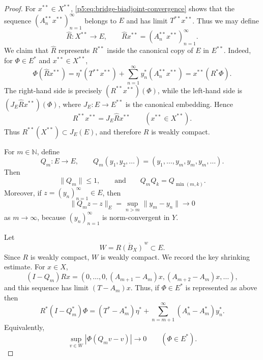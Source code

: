 \documentclass[11pt,reqno]{amsart}
\makeatletter
\theoremstyle{plain}
\theoremstyle{definition}
\newcounter{problempaper}
\newenvironment{problempaperbody}{%
  \setcounter{subsection}{0}%
  \setcounter{subsubsection}{0}%
  \setcounter{paragraph}{0}%
  \renewcommand{\thesubsection}{\arabic{subsection}}%
  \renewcommand{\thesubsubsection}{\thesubsection.\arabic{subsubsection}}%
  \renewcommand{\theparagraph}{\thesubsubsection.\arabic{paragraph}}%
  \let\problem@outersection\section
  \let\problem@outersubsection\subsection
  \let\problem@outersubsubsection\subsubsection
  \let\problem@outerparagraph\paragraph
  \let\section\problem@papersection
  \let\subsection\problem@papersubsection
  \let\subsubsection\problem@papersubsubsection
}{%
  \let\section\problem@outersection
  \let\subsection\problem@outersubsection
  \let\subsubsection\problem@outersubsubsection
  \let\paragraph\problem@outerparagraph
}
\newcommand{\problem@target}[2]{%
  \hypertarget{problem-\theproblempaper-#1-#2}{}%
}
\newcommand{\problem@paperheading}[3]{%
  \par\bigskip
  \problem@target{#1}{#2}%
  \noindent{\large\bfseries #2.\quad #3\par}%
  \nobreak\smallskip
}
\newcommand{\problem@papersubheading}[3]{%
  \par\medskip
  \problem@target{#1}{#2}%
  \noindent{\normalsize\bfseries #2.\quad #3\par}%
  \nobreak\smallskip
}
\newcommand{\problem@papersubsubheading}[3]{%
  \par\smallskip
  \problem@target{#1}{#2}%
  \noindent{\normalsize\itshape #2.\quad #3.\ }%
}
\def\problem@papersection{%
  \@ifstar{\problem@papersectionstar}{\problem@papersectionnostar}%
}
\def\problem@papersectionstar#1{%
  \par\bigskip\noindent{\large\bfseries #1\par}\nobreak\smallskip
}
\def\problem@papersectionnostar#1{%
  \refstepcounter{subsection}%
  \setcounter{subsubsection}{0}%
  \setcounter{paragraph}{0}%
  \problem@paperheading{section}{\thesubsection}{#1}%
  \problem@writecontentsline{section}{\thesubsection}{#1}%
}
\def\problem@papersubsection{%
  \@ifstar{\problem@papersubsectionstar}{\problem@papersubsectionnostar}%
}
\def\problem@papersubsectionstar#1{%
  \par\medskip\noindent{\normalsize\bfseries #1\par}\nobreak\smallskip
}
\def\problem@papersubsectionnostar#1{%
  \refstepcounter{subsubsection}%
  \setcounter{paragraph}{0}%
  \problem@papersubheading{subsection}{\thesubsubsection}{#1}%
  \problem@writecontentsline{subsection}{\thesubsubsection}{#1}%
}
\def\problem@papersubsubsection{%
  \@ifstar{\problem@papersubsubsectionstar}{\problem@papersubsubsectionnostar}%
}
\def\problem@papersubsubsectionstar#1{%
  \par\smallskip\noindent{\normalsize\itshape #1.\ }%
}
\def\problem@papersubsubsectionnostar#1{%
  \refstepcounter{paragraph}%
  \problem@papersubsubheading{subsubsection}{\theparagraph}{#1}%
  \problem@writecontentsline{subsubsection}{\theparagraph}{#1}%
}
\newcommand{\problem@writecontentsline}[3]{%
  \begingroup
  \protected@write\@auxout{}{%
    \string\problemcontentsentry{\theproblempaper}{#1}{#2}{#3}{\thepage}%
  }%
  \endgroup
}
\newcommand{\problemcontentsentry}[5]{%
  \@ifundefined{problemcontents@#1}{%
    \expandafter\gdef\csname problemcontents@#1\endcsname{}%
  }{}%
  \expandafter\g@addto@macro\csname problemcontents@#1\endcsname{%
    \problemcontentsline{#1}{#2}{#3}{#4}{#5}%
  }%
}
\newcommand{\problemcontentslink}[4]{%
  \hyperlink{problem-#1-#2-#3}{#4}%
}
\newcommand{\problemcontentsline}[5]{%
  \ifstrequal{#2}{section}{%
    \par\noindent
    \problemcontentslink{#1}{#2}{#3}{\makebox[2.5em][l]{#3}#4}%
    \nobreak\dotfill
    \problemcontentslink{#1}{#2}{#3}{#5}\par
  }{%
    \ifstrequal{#2}{subsection}{%
      \par\noindent\hspace*{1.5em}%
      \problemcontentslink{#1}{#2}{#3}{\makebox[3.5em][l]{#3}#4}%
      \nobreak\dotfill
      \problemcontentslink{#1}{#2}{#3}{#5}\par
    }{%
      \par\noindent\hspace*{3em}%
      \problemcontentslink{#1}{#2}{#3}{\makebox[4.5em][l]{#3}#4}%
      \nobreak\dotfill
      \problemcontentslink{#1}{#2}{#3}{#5}\par
    }%
  }%
}
\makeatother
\begin{document}
\begin{problempaperbody}
\begin{proof}
For $x^{**}\in X^{**}$, \eqref{p5:eq:bridge-biadjoint-convergence} shows that the sequence $(A_n^{**}x^{**})_{n=1}^{\infty}$ belongs to $E$ and has limit $T^{**}x^{**}$. Thus we may define
\begin{equation*}
        \widehat R\colon X^{**}\to E,\qquad \widehat R x^{**}=(A_n^{**}x^{**})_{n=1}^{\infty}.
\end{equation*}
We claim that $\widehat R$ represents $R^{**}$ inside the canonical copy of $E$ in $E^{**}$. Indeed, for $\Phi\in E^*$ and $x^{**}\in X^{**}$,
\begin{equation*}
        \Phi(\widehat R x^{**})=\eta^*(T^{**}x^{**})+\sum_{n=1}^{\infty} y_n^*(A_n^{**}x^{**})=x^{**}(R^*\Phi).
\end{equation*}
The right-hand side is precisely $(R^{**}x^{**})(\Phi)$, while the left-hand side is $(J_E\widehat R x^{**})(\Phi)$, where $J_E\colon E\to E^{**}$ is the canonical embedding. Hence
\begin{equation*}
        R^{**}x^{**}=J_E\widehat R x^{**}\qquad (x^{**}\in X^{**}).
\end{equation*}
Thus $R^{**}(X^{**})\subset J_E(E)$, and therefore $R$ is weakly compact.


For $m\in\mathbb N$, define
\begin{equation*}
        Q_m\colon E\to E,\qquad Q_m(y_1,y_2,\ldots)=(y_1,\ldots,y_m,y_m,y_m,\ldots).
\end{equation*}
Then
\begin{equation*}
        \|Q_m\|\leq1, \qquad\text{and} \qquad Q_mQ_k=Q_{\min(m,k)}.
\end{equation*}
Moreover, if $z=(y_n)_{n=1}^{\infty}\in E$, then
\begin{equation*}
        \|Q_mz-z\|_E=\sup_{n>m}\|y_m-y_n\|\to0
\end{equation*}
as $m\to\infty$, because $(y_n)_{n=1}^{\infty}$ is norm-convergent in $Y$.

Let
\begin{equation*}
        W=\overline{R(B_X)}^{\,w}\subset E .
\end{equation*}
Since $R$ is weakly compact, $W$ is weakly compact. We record the key shrinking estimate. For $x\in X$,
\begin{equation*}
        (I-Q_m)Rx=(0,\ldots,0,(A_{m+1}-A_m)x,(A_{m+2}-A_m)x,\ldots),
\end{equation*}
and this sequence has limit $(T-A_m)x$. Thus, if $\Phi\in E^*$ is represented as above then
\begin{equation*}
        R^*(I-Q_m^*)\Phi=(T^*-A_m^*)\eta^*+\sum_{n=m+1}^{\infty}(A_n^*-A_m^*)y_n^* .
\end{equation*}
Equivalently,
\begin{equation*}
        \sup_{v\in W}|\Phi(Q_mv-v)|\to0\qquad (\Phi\in E^*).
\end{equation*}


\end{proof}
\end{problempaperbody}
\end{document}

